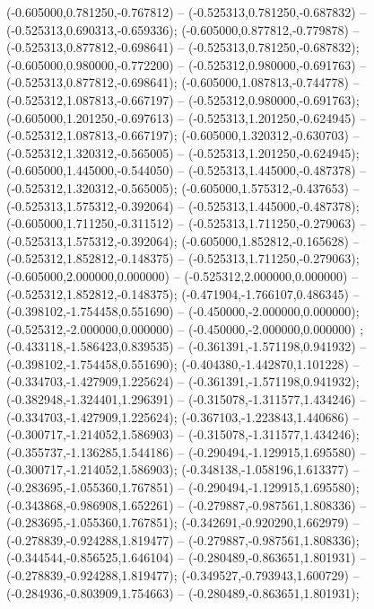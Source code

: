  (-0.605000,0.781250,-0.767812) -- (-0.525313,0.781250,-0.687832) -- (-0.525313,0.690313,-0.659336);
 (-0.605000,0.877812,-0.779878) -- (-0.525313,0.877812,-0.698641) -- (-0.525313,0.781250,-0.687832);
 (-0.605000,0.980000,-0.772200) -- (-0.525312,0.980000,-0.691763) -- (-0.525313,0.877812,-0.698641);
 (-0.605000,1.087813,-0.744778) -- (-0.525312,1.087813,-0.667197) -- (-0.525312,0.980000,-0.691763);
 (-0.605000,1.201250,-0.697613) -- (-0.525313,1.201250,-0.624945) -- (-0.525312,1.087813,-0.667197);
 (-0.605000,1.320312,-0.630703) -- (-0.525312,1.320312,-0.565005) -- (-0.525313,1.201250,-0.624945);
 (-0.605000,1.445000,-0.544050) -- (-0.525313,1.445000,-0.487378) -- (-0.525312,1.320312,-0.565005);
 (-0.605000,1.575312,-0.437653) -- (-0.525313,1.575312,-0.392064) -- (-0.525313,1.445000,-0.487378);
 (-0.605000,1.711250,-0.311512) -- (-0.525313,1.711250,-0.279063) -- (-0.525313,1.575312,-0.392064);
 (-0.605000,1.852812,-0.165628) -- (-0.525312,1.852812,-0.148375) -- (-0.525313,1.711250,-0.279063);
 (-0.605000,2.000000,0.000000) -- (-0.525312,2.000000,0.000000) -- (-0.525312,1.852812,-0.148375);
 (-0.471904,-1.766107,0.486345) -- (-0.398102,-1.754458,0.551690) -- (-0.450000,-2.000000,0.000000);
 (-0.525312,-2.000000,0.000000) -- (-0.450000,-2.000000,0.000000) ;
 (-0.433118,-1.586423,0.839535) -- (-0.361391,-1.571198,0.941932) -- (-0.398102,-1.754458,0.551690);
 (-0.404380,-1.442870,1.101228) -- (-0.334703,-1.427909,1.225624) -- (-0.361391,-1.571198,0.941932);
 (-0.382948,-1.324401,1.296391) -- (-0.315078,-1.311577,1.434246) -- (-0.334703,-1.427909,1.225624);
 (-0.367103,-1.223843,1.440686) -- (-0.300717,-1.214052,1.586903) -- (-0.315078,-1.311577,1.434246);
 (-0.355737,-1.136285,1.544186) -- (-0.290494,-1.129915,1.695580) -- (-0.300717,-1.214052,1.586903);
 (-0.348138,-1.058196,1.613377) -- (-0.283695,-1.055360,1.767851) -- (-0.290494,-1.129915,1.695580);
 (-0.343868,-0.986908,1.652261) -- (-0.279887,-0.987561,1.808336) -- (-0.283695,-1.055360,1.767851);
 (-0.342691,-0.920290,1.662979) -- (-0.278839,-0.924288,1.819477) -- (-0.279887,-0.987561,1.808336);
 (-0.344544,-0.856525,1.646104) -- (-0.280489,-0.863651,1.801931) -- (-0.278839,-0.924288,1.819477);
 (-0.349527,-0.793943,1.600729) -- (-0.284936,-0.803909,1.754663) -- (-0.280489,-0.863651,1.801931);
